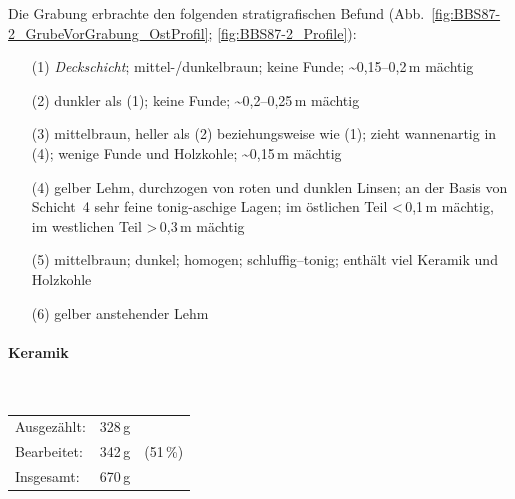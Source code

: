 \noindent Die Grabung erbrachte den folgenden stratigrafischen Befund (Abb.~\ref{fig:BBS87-2_GrubeVorGrabung_OstProfil}; \ref{fig:BBS87-2_Profile}):
\begin{itemize}[leftmargin=*, labelindent=1em, noitemsep, topsep=0pt]
\item [(1)] \textit{Deckschicht}; mittel-/dunkelbraun; keine Funde; \textasciitilde0,15--0,2\,m mächtig
\item [(2)] dunkler als (1); keine Funde; \textasciitilde0,2--0,25\,m mächtig
\item [(3)] mittelbraun, heller als (2) beziehungsweise wie (1); zieht wannenartig in (4); wenige Funde und Holzkohle; \textasciitilde0,15\,m mächtig
\item [(4)] gelber Lehm, durchzogen von roten und dunklen Linsen; an der Basis von Schicht~4 sehr feine tonig-aschige Lagen; im östlichen Teil \textless\,0,1\,m mächtig, im westlichen Teil \textgreater\,0,3\,m mächtig
\item [(5)] mittelbraun; dunkel; homogen; schluffig--tonig; enthält viel Keramik und Holzkohle
\item [(6)] gelber anstehender Lehm
\end{itemize}

\paragraph{Keramik\vspace{.5em}}\mbox{}\\
\begin{tabular}{@{}lrl@{}}
Ausgezählt: & 328\,g & \\ 
Bearbeitet: & 342\,g & (51\,\%) \\ 
Insgesamt: & 670\,g & \\ 
\end{tabular} 

